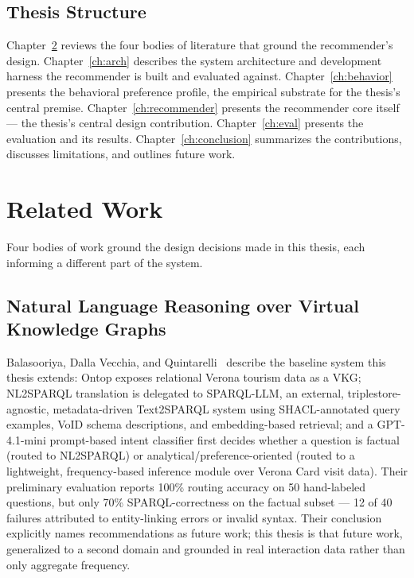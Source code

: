 \documentclass[11pt,a4paper,oneside]{book}
\begin{document}
\section{Thesis Structure}
\label{sec:intro-outline}

Chapter~\ref{ch:relwork} reviews the four bodies of literature that ground the recommender's
design. Chapter~\ref{ch:arch} describes the system architecture and development harness the
recommender is built and evaluated against. Chapter~\ref{ch:behavior} presents the behavioral
preference profile, the empirical substrate for the thesis's central premise.
Chapter~\ref{ch:recommender} presents the recommender core itself --- the thesis's central design
contribution. Chapter~\ref{ch:eval} presents the evaluation and its results.
Chapter~\ref{ch:conclusion} summarizes the contributions, discusses limitations, and outlines
future work.

\chapter{Related Work}
\label{ch:relwork}

Four bodies of work ground the design decisions made in this thesis, each informing a different
part of the system.

\section{Natural Language Reasoning over Virtual Knowledge Graphs}
\label{sec:rel-nl2sparql}

Balasooriya, Dalla Vecchia, and Quintarelli~\cite{balasooriya2026} describe the baseline system
this thesis extends: Ontop exposes relational Verona tourism data as a VKG; NL2SPARQL translation
is delegated to SPARQL-LLM, an external, triplestore-agnostic, metadata-driven Text2SPARQL system
using SHACL-annotated query examples, VoID schema descriptions, and embedding-based retrieval; and
a GPT-4.1-mini prompt-based intent classifier first decides whether a question is factual (routed
to NL2SPARQL) or analytical/preference-oriented (routed to a lightweight, frequency-based inference
module over Verona Card visit data). Their preliminary evaluation reports 100\% routing accuracy on
50 hand-labeled questions, but only 70\% SPARQL-correctness on the factual subset --- 12 of 40
failures attributed to entity-linking errors or invalid syntax. Their conclusion explicitly names
recommendations as future work; this thesis is that future work, generalized to a second domain and
grounded in real interaction data rather than only aggregate frequency.
\end{document}
